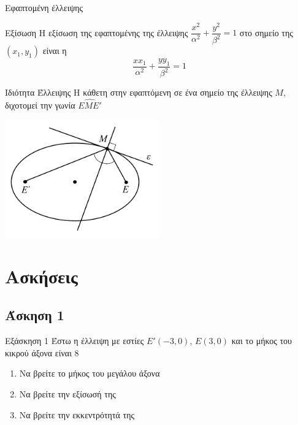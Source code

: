 \documentclass[greek]{beamer}
\begin{document}
\begin{frame}[label=Εφαπτόμενη]{Εφαπτομένη έλλειψης}
 \begin{block}{Εξίσωση}
  Η εξίσωση της εφαπτομένης της έλλειψης $\dfrac{x^2}{α^2}+\dfrac{y^2}{β^2}=1$ στο σημείο της $(x_1,y_1)$ είναι η $$\dfrac{xx_1}{α^2}+\dfrac{yy_1}{β^2}=1$$
 \end{block}

 \hyperlink{ΑπόδειξηΕφαπτόμενη}{}
\end{frame}

\begin{frame}[label=Ιδιότητες]{Ιδιότητα Έλλειψης}
 Η κάθετη στην εφαπτόμενη σε ένα σημείο της έλλειψης $Μ$, διχοτομεί την γωνία $\widehat{ΕΜΕ'}$

 \centering
 \includegraphics[width=0.5\textwidth]{"../images/reflection2.png"}

 \hyperlink{Απόδειξη}{}
\end{frame}

\section{Ασκήσεις}
\subsection{Άσκηση 1}
\begin{frame}[label=Άσκηση1,t]{Εξάσκηση 1}
 Έστω η έλλειψη με εστίες $Ε'(-3,0)$, $Ε(3,0)$ και το μήκος του κικρού άξονα είναι $8$
 \begin{enumerate}
  \item<1-> Να βρείτε το μήκος του μεγάλου άξονα
  \item<2-> Να βρείτε την εξίσωσή της
  \item<3-> Να βρείτε την εκκεντρότητά της
 \end{enumerate}

\end{frame}
\end{document}
